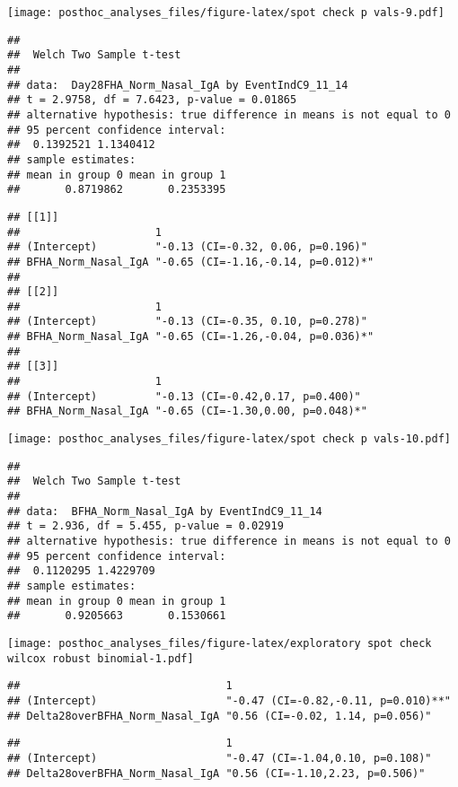 \documentclass[
]{article}
\begin{document}
\texttt{[image: posthoc\_analyses\_files/figure-latex/spot check p vals-9.pdf]}

\begin{verbatim}
## 
##  Welch Two Sample t-test
## 
## data:  Day28FHA_Norm_Nasal_IgA by EventIndC9_11_14
## t = 2.9758, df = 7.6423, p-value = 0.01865
## alternative hypothesis: true difference in means is not equal to 0
## 95 percent confidence interval:
##  0.1392521 1.1340412
## sample estimates:
## mean in group 0 mean in group 1 
##       0.8719862       0.2353395
\end{verbatim}

\begin{verbatim}
## [[1]]
##                     1                                 
## (Intercept)         "-0.13 (CI=-0.32, 0.06, p=0.196)" 
## BFHA_Norm_Nasal_IgA "-0.65 (CI=-1.16,-0.14, p=0.012)*"
## 
## [[2]]
##                     1                                 
## (Intercept)         "-0.13 (CI=-0.35, 0.10, p=0.278)" 
## BFHA_Norm_Nasal_IgA "-0.65 (CI=-1.26,-0.04, p=0.036)*"
## 
## [[3]]
##                     1                                
## (Intercept)         "-0.13 (CI=-0.42,0.17, p=0.400)" 
## BFHA_Norm_Nasal_IgA "-0.65 (CI=-1.30,0.00, p=0.048)*"
\end{verbatim}

\texttt{[image: posthoc\_analyses\_files/figure-latex/spot check p vals-10.pdf]}

\begin{verbatim}
## 
##  Welch Two Sample t-test
## 
## data:  BFHA_Norm_Nasal_IgA by EventIndC9_11_14
## t = 2.936, df = 5.455, p-value = 0.02919
## alternative hypothesis: true difference in means is not equal to 0
## 95 percent confidence interval:
##  0.1120295 1.4229709
## sample estimates:
## mean in group 0 mean in group 1 
##       0.9205663       0.1530661
\end{verbatim}

\texttt{[image: posthoc\_analyses\_files/figure-latex/exploratory spot check wilcox robust binomial-1.pdf]}

\begin{verbatim}
##                                1                                  
## (Intercept)                    "-0.47 (CI=-0.82,-0.11, p=0.010)**"
## Delta28overBFHA_Norm_Nasal_IgA "0.56 (CI=-0.02, 1.14, p=0.056)"
\end{verbatim}

\begin{verbatim}
##                                1                               
## (Intercept)                    "-0.47 (CI=-1.04,0.10, p=0.108)"
## Delta28overBFHA_Norm_Nasal_IgA "0.56 (CI=-1.10,2.23, p=0.506)"
\end{verbatim}
\end{document}
